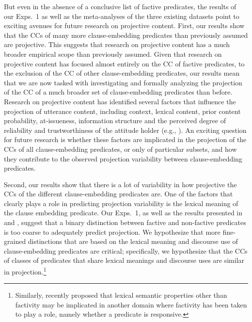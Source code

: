 \documentclass[11pt,fleqn]{article}
\newcommand{\6}{\mbox{$[\hspace*{-.6mm}[$}}
\newcommand{\9}{\mbox{$]\hspace*{-.6mm}]$}}
\begin{document}
But even in the absence of a conclusive list of factive predicates, the results of our Exps.~1 as well as the meta-analyses of the three existing datasets point to exciting avenues for future research on projective content. First, our results show that the CCs of many more clause-embedding predicates than previously assumed are projective. This suggests that research on projective content has a much broader empirical scope than previously assumed. Given that research on projective content has focused almost entirely on the CC of  factive predicates, to the exclusion of the CC of other clause-embedding predicates, our results mean that we are now tasked with investigating and formally analyzing the projection of the CC of a much broader set of clause-embedding predicates than before. Research on projective content has identified several factors that influence the projection of utterance content, including context, lexical content, prior content probability, at-issueness, information structure and the perceived degree of reliability and trustworthiness of the attitude holder (e.g., \citealt{gazdar79a,gazdar79b,beaver-belly,schlenker10,brst-salt10,best-question,abrusan2011,abrusan2016,anand-hacquard2014,cummins-rohde2015,djaerv-bacovcin-salt27,mahler-etal2020,mahler2020,tonhauser-salt26,tonhauser-guarani-variability,tbd-variability,tonhauser-etal-sub23,degen-tonhauser-openmind}). An exciting question for future research is whether these factors are implicated in the projection of the CCs of all clause-embedding predicates, or only of particular subsets, and how they contribute to the observed projection variability between clause-embedding predicates.

Second, our results show that there is a lot of variability in how projective the CCs of the different clause-embedding predicates are. One of the factors that clearly plays a role in predicting projection variability is the lexical meaning of the clause embedding predicate. Our Exps.~1, as well as the results presented in \citealt{tbd-variability,demarneffe-etal-sub23} and \citealt{degen-tonhauser-openmind}, suggest that a binary distinction between factive and non-factive predicates is too coarse to adequately predict projection. We hypothesize that more fine-grained distinctions that are based on the lexical meaning and discourse use of clause-embedding predicates are critical; specifically, we hypothesize that the CCs of classes of predicates that share lexical meanings and discourse uses are similar in projection.\footnote{Similarly, \citealt{white2021} recently proposed that lexical semantic properties other than factivity may be implicated in another domain where factivity has been taken to play a role, namely whether a predicate is responsive.}
 
\end{document}
